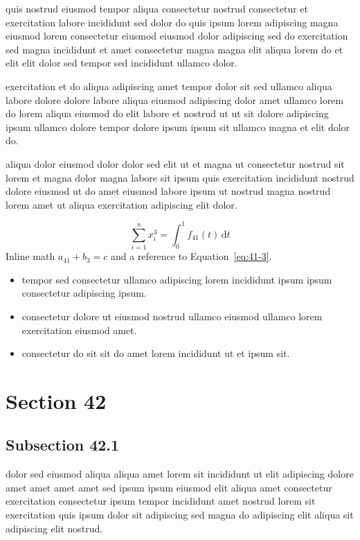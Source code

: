 \documentclass{article}
\begin{document}
quis nostrud eiusmod tempor aliqua consectetur nostrud consectetur et exercitation labore incididunt sed dolor do quis ipsum lorem adipiscing magna eiusmod lorem consectetur eiusmod eiusmod dolor adipiscing sed do exercitation sed magna incididunt et amet consectetur magna magna elit aliqua lorem do et elit elit dolor sed tempor sed incididunt ullamco dolor.

exercitation et do aliqua adipiscing amet tempor dolor sit sed ullamco aliqua labore dolore dolore labore aliqua eiusmod adipiscing dolor amet ullamco lorem do lorem aliqua eiusmod do elit labore et nostrud ut ut sit dolore adipiscing ipsum ullamco dolore tempor dolore ipsum ipsum sit ullamco magna et elit dolor do.

aliqua dolor eiusmod dolor dolor sed elit ut et magna ut consectetur nostrud sit lorem et magna dolor magna labore sit ipsum quis exercitation incididunt nostrud dolore eiusmod ut do amet eiusmod labore ipsum ut nostrud magna nostrud lorem amet ut aliqua exercitation adipiscing elit dolor.

\begin{equation}\label{eq:41-3}
  \sum_{i=1}^{n} x_i^{3} = \int_0^1 f_{41}(t)\,\mathrm{d}t
\end{equation}
Inline math $a_{41} + b_{3} = c$ and a reference to Equation~\eqref{eq:41-3}.

\begin{itemize}
  \item tempor sed consectetur ullamco adipiscing lorem incididunt ipsum ipsum consectetur adipiscing ipsum.
  \item consectetur dolore ut eiusmod nostrud ullamco eiusmod ullamco lorem exercitation eiusmod amet.
  \item consectetur do sit sit do amet lorem incididunt ut et ipsum sit.
\end{itemize}

\section{Section 42}\label{sec:42}
\subsection{Subsection 42.1}\label{sec:42-1}
dolor sed eiusmod aliqua aliqua amet lorem sit incididunt ut elit adipiscing dolore amet amet amet amet sed ipsum ipsum eiusmod elit aliqua amet consectetur exercitation consectetur ipsum tempor incididunt amet nostrud lorem sit exercitation quis ipsum dolor sit adipiscing sed magna do adipiscing elit aliqua sit adipiscing elit nostrud.
\end{document}
